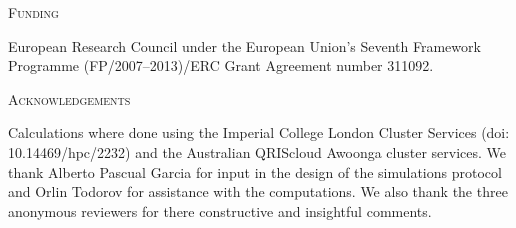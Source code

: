 \documentclass[12pt,letterpaper]{article}
\renewcommand{\section}[1]{%
\bigskip
\begin{center}
\begin{Large}
\normalfont\scshape #1
\medskip
\end{Large}
\end{center}}
\begin{document}
\section{Funding}
European Research Council under the European Union’s Seventh Framework Programme (FP/2007–2013)/ERC Grant Agreement number 311092.

\section{Acknowledgements}
Calculations where done using the Imperial College London Cluster Services (doi: 10.14469/hpc/2232) and the Australian QRIScloud Awoonga cluster services. We thank Alberto Pascual Garcia for input in the design of the simulations protocol and Orlin Todorov for assistance with the computations. We also thank the three anonymous reviewers for there constructive and insightful comments.



\end{document}
